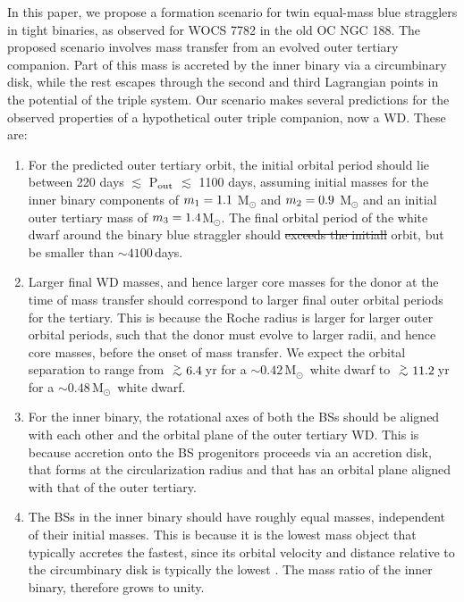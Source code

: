 \documentclass[twocolumn]{aastex62}
\newcommand{\MSun}{\mbox{M$_\odot$}}
\def\apgt{\ {\raise-.5ex\hbox{$\buildrel>\over\sim$}}\ }
\providecommand{\DIFadd}[1]{{\protect\color{blue}\uwave{#1}}} %
\providecommand{\DIFdel}[1]{{\protect\color{red}\sout{#1}}}                      %
\providecommand{\DIFaddbegin}{} %
\providecommand{\DIFaddend}{} %
\providecommand{\DIFdelbegin}{} %
\providecommand{\DIFdelend}{} %
\begin{document}
In this paper, we propose a formation scenario for twin equal-mass
blue stragglers in tight binaries, as observed for WOCS 7782 in the
old OC NGC 188.  The proposed scenario involves mass transfer from an
evolved outer tertiary companion. Part of this mass is accreted by the
inner binary via a circumbinary disk, while the rest escapes through the
second and third Lagrangian points in the potential of the triple
system.  Our scenario makes several predictions for the observed
properties of a hypothetical outer triple companion, now a WD.  These
are:

 \begin{enumerate} 

\item For the predicted outer tertiary orbit, the initial orbital
  period should lie between 220 days $\lesssim$ P$_{\rm out}$
  $\lesssim$ 1100 days, assuming initial masses for the inner binary
  components of $m_{\rm 1} = 1.1$ M$_{\odot}$ and $m_{\rm 2} = 0.9$
  M$_{\odot}$ and an initial outer tertiary mass of $m_{\rm 3} = 1.4
  $M$_{\odot}$. The final orbital period of the white dwarf
    around the binary blue straggler should \DIFdelbegin \DIFdel{exceeds the initiall
    }\DIFdelend \DIFaddbegin \DIFadd{exceed the initial
    }\DIFaddend orbit, but be smaller than $\sim 4100$\,days.

\item Larger final WD masses, and hence larger core masses for the
  donor at the time of mass transfer should correspond to larger final
  outer orbital periods for the tertiary.  This is because the Roche
  radius is larger for larger outer orbital periods, such that the
  donor must evolve to larger radii, and hence core masses, before the
  onset of mass transfer. We expect the orbital separation to range
  from $\apgt 6.4$\,yr for a $\sim 0.42$\,\MSun\, white dwarf to
  $\apgt 11.2$\,yr for a $\sim 0.48$\,\MSun\, white dwarf.

\item For the inner binary, the rotational axes of both the BSs should
  be aligned with each other and the orbital plane of the outer
  tertiary WD.  This is because accretion onto the BS progenitors
  proceeds via an accretion disk, that forms at the circularization
  radius and that has an orbital plane aligned with that of the outer
  tertiary.

\item The BSs in the inner binary should have roughly equal masses,
  independent of their initial masses.  This is because it is the
  lowest mass object that typically accretes the fastest, since its
  orbital velocity and distance relative to the circumbinary disk is
  typically the lowest
  \citep[e.g.][]{2000MNRAS.314...33B,2012ApJ...749..118S,2017MNRAS.466.1170M}.
  The mass ratio of the inner binary, therefore grows to unity.  


\end{enumerate}
\end{document}
